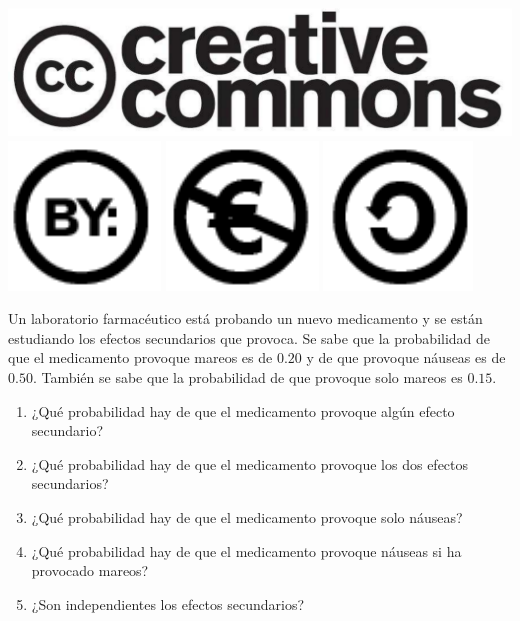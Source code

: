 \documentclass[aspectratio=149,10pt,xcolor=dvipsnames,t]{beamer}
\begin{document}
\begin{frame}[c]
\begin{center}
		\biskip
		\includegraphics[scale=0.07]{../img/cc-logo}
		\includegraphics[scale=0.2]{../img/cc-by}
		\includegraphics[scale=0.2]{../img/cc-e}
		\includegraphics[scale=0.2]{../img/cc-c}
	\end{center}
\end{frame}

\begin{frame}[c]
	\large
	Un laboratorio farmacéutico está probando un nuevo medicamento y se están estudiando los efectos secundarios que
	provoca.
	Se sabe que la probabilidad de que el medicamento provoque mareos es de $0.20$ y de que provoque náuseas es de $0.50$.
	También se sabe que la probabilidad de que provoque solo mareos es $0.15$.
	\begin{enumerate}
		\item ¿Qué probabilidad hay de que el medicamento provoque algún efecto secundario?
		\item ¿Qué probabilidad hay de que el medicamento provoque los dos efectos secundarios?
		\item ¿Qué probabilidad hay de que el medicamento provoque solo náuseas?
		\item ¿Qué probabilidad hay de que el medicamento provoque náuseas si ha provocado mareos?
		\item ¿Son independientes los efectos secundarios?
	\end{enumerate}
\end{frame}
\end{document}
